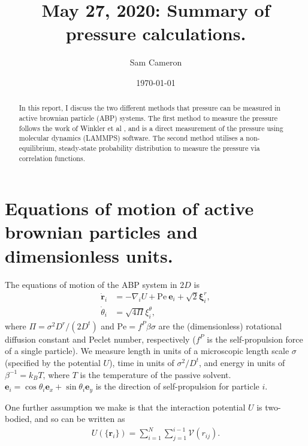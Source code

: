 \documentclass[twocolumn,amsmath,amssymb,aps]{revtex4-1}%
\begin{document}
 
\title{May 27, 2020: Summary of pressure calculations.}
\author{Sam Cameron}
%
\date{\today}

\begin{abstract}
  In this report, I discuss the two different methods that pressure
  can be measured in active brownian particle (ABP) systems. The
  first method to measure the pressure follows the work of Winkler
  et al \cite{C5SM01412C}, and is a direct measurement of the
  pressure using molecular dynamics (LAMMPS) software.
  The second method utilises a non-equilibrium, steady-state
  probability distribution \cite{liverpool2018nonequilibrium}
  to measure the pressure via correlation functions.
\end{abstract}


\maketitle

\section{Equations of motion of active brownian particles and
  dimensionless units.}

The equations of motion of the ABP system in $2D$ is
\begin{subequations}
  \label{eqs:ABPsEOMs}
  \begin{align}
    \dot{\bm{r}}_i
    &= -\nabla_i U+\mathrm{Pe}\:\bm{e}_i + \sqrt{2}\bm{\xi}_{i}^r,
    \label{eq:pos_EOM}\\
    \dot{\theta}_i &= \sqrt{4\Pi}\xi_i^{\theta}\label{eq:theta_EOM},
  \end{align}
\end{subequations}
where $\Pi=\sigma^2D^r/(2D^t)$ and $\mathrm{Pe} = f^P\beta\sigma$ are the
(dimensionless) rotational diffusion constant and Peclet number,
respectively ($f^P$ is the self-propulsion force of a single particle).
We measure length in units of a microscopic length scale $\sigma$
(specified by the potential $ U$), time in units of $\sigma^2/D^t$,
and energy in units of $\beta^{-1}= k_B T$, where $T$ is the temperature
of the passive solvent.
$\bm{e}_i = \cos\theta_i\bm{e}_x + \sin\theta_i\bm{e}_y$ is the direction
of self-propulsion for particle $i$.

One further assumption we make is that the interaction potential $U$
is two-bodied, and so can be written as
\begin{align}
  U(\{\bm{r}_i\})
  = \sum_{i=1}^N\sum_{j=1}^{i-1}\mathcal{V}(r_{ij}).
\end{align}
\end{document}
